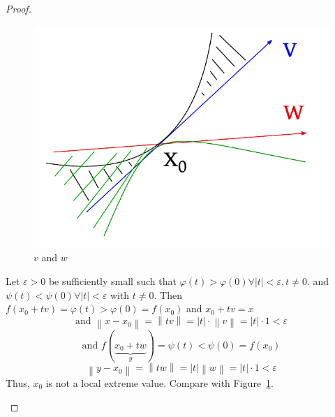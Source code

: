 \documentclass{article}
\newcommand{\norm}[1]{\left\|#1\right\|}
\newcommand{\card}[1]{\left|#1\right|}
\begin{document}
\begin{proof}
\begin{enumerate}
      \begin{figure}[t]
        \begin{center}
          \includegraphics{img/36_dir.pdf}
          \caption{$v$ and $w$}
          \label{img:vandw}
        \end{center}
      \end{figure}

      Let $\varepsilon > 0$ be sufficiently small such that $\varphi(t) > \varphi(0) \forall \card{t} < \varepsilon, t \neq 0$.
      and $\psi(t) < \psi(0) \forall \card{t} < \varepsilon$ with $t \neq 0$.
      Then $f(x_0 + tv) = \varphi(t) > \varphi(0) = f(x_0)$ and $x_0 + tv = x$
      \[ \text{and } \norm{x - x_0} = \norm{tv} = \card{t} \cdot \norm{v} = \card{t} \cdot 1 < \varepsilon \]
      \[ \text{and } f(\underbrace{x_0 + tw}_{y}) = \psi(t) < \psi(0) = f(x_0) \]
      \[ \norm{y - x_0} = \norm{tw} = \card{t} \norm{w} = \card{t} \cdot 1 < \varepsilon \]
      Thus, $x_0$ is not a local extreme value.
      Compare with Figure~\ref{img:vandw}.
  \end{enumerate}
\end{proof}
\end{document}
